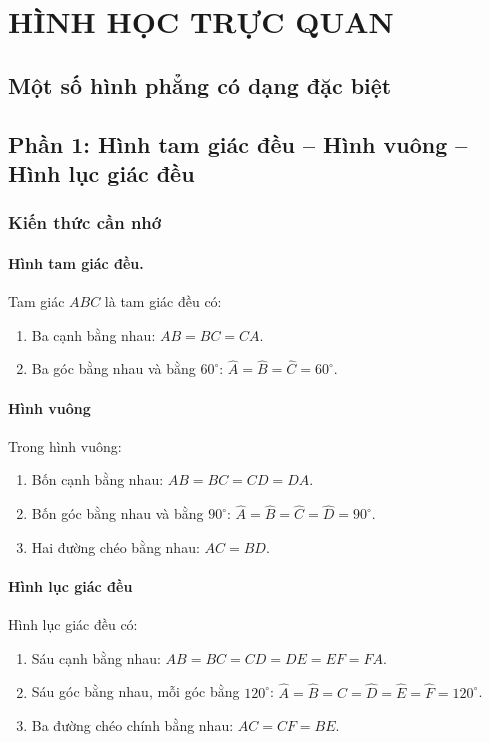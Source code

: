 \def\i{\item}
\graphicspath{{../pictures/vande34/}}
\chapter{HÌNH HỌC TRỰC QUAN}
\section{Một số hình phẳng có dạng đặc biệt}
\section*{Phần 1: Hình tam giác đều -- Hình vuông -- Hình lục giác đều}
\subsection{Kiến thức cần nhớ}
\subsubsection{Hình tam giác đều.}
Tam giác $ABC$ là tam giác đều có:
\begin{enumerate}[--, leftmargin=*]
	\i Ba cạnh bằng nhau: $AB = BC = CA$.  
	\i Ba góc bằng nhau và bằng $60^\circ$: $\widehat{A} = \widehat{B}= \widehat{C} = 60^\circ$.
\end{enumerate}
\subsubsection{Hình vuông} 
Trong hình vuông:
\begin{enumerate}[--, leftmargin=*]
	\i Bốn cạnh bằng nhau: $AB = BC = CD = DA$. 
	\i Bốn góc bằng nhau và bằng $90^\circ$: $\widehat{A} = \widehat{B}= \widehat{C} = \widehat{D} = 90^\circ$.   
	\i Hai đường chéo bằng nhau: $AC = BD$.
\end{enumerate} 
\subsubsection{Hình lục giác đều}
Hình lục giác đều có:
\begin{enumerate}[--, leftmargin=*]
	\i Sáu cạnh bằng nhau: $AB = BC = CD = DE = EF = FA$.  
	\i Sáu góc bằng nhau, mỗi góc bằng $120^\circ$: $\widehat{A} = \widehat{B}= \widehat{C} = \widehat{D} = \widehat{E} = \widehat{F} =  120^\circ$. 
	\i Ba đường chéo chính bằng nhau: $AC = CF = BE$.
\end{enumerate}


